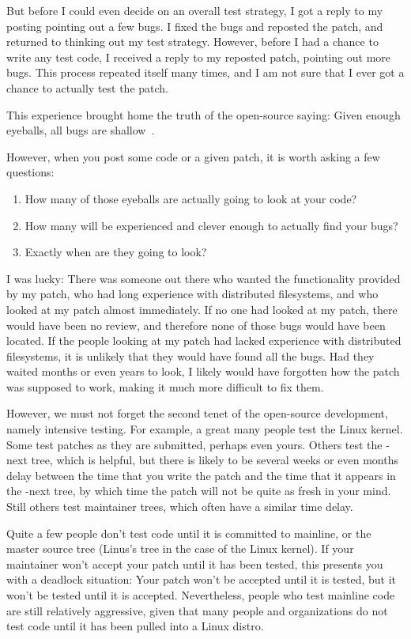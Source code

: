 But before I could even decide on an overall test strategy, I got a
reply to my posting pointing out a few bugs.
I fixed the bugs and reposted the patch, and returned to thinking
out my test strategy.
However, before I had a chance to write any test code, I received
a reply to my reposted patch, pointing out more bugs.
This process repeated itself many times, and I am not sure that I
ever got a chance to actually test the patch.

This experience brought home the truth of the open-source saying:
Given enough eyeballs, all bugs are shallow~\cite{EricSRaymond99b}.

However, when you post some code or a given patch, it is worth
asking a few questions:

\begin{enumerate}
\item	How many of those eyeballs are actually going to look at your code?
\item	How many will be experienced and clever enough to actually find
	your bugs?
\item	Exactly when are they going to look?
\end{enumerate}

I was lucky:
There was someone out there who wanted the functionality
provided by my patch, who had long experience with distributed filesystems,
and who looked at my patch almost immediately.
If no one had looked at my patch, there would have been no review, and
therefore none of those bugs would have been located.
If the people looking at my patch had lacked experience with distributed
filesystems, it is unlikely that they would have found all the bugs.
Had they waited months or even years to look, I likely would have forgotten
how the patch was supposed to work, making it much more difficult to
fix them.

However, we must not forget the second tenet of the open-source development,
namely intensive testing.
For example, a great many people test the Linux kernel.
Some test patches as they are submitted, perhaps even yours.
Others test the -next tree, which is helpful, but there is likely to be
several weeks or even months delay between the time that you write the
patch and the time that it appears in the -next tree, by which time the
patch will not be quite as fresh in your mind.
Still others test maintainer trees, which often have a similar time delay.

Quite a few people don't test code until it is committed to mainline,
or the master source tree (Linus's tree in the case of the Linux kernel).
If your maintainer won't accept your patch until it has been tested,
this presents you with a deadlock situation:
Your patch won't be accepted until it is tested, but it won't be tested
until it is accepted.
Nevertheless, people who test mainline code are still relatively
aggressive, given that many people and organizations do not test code
until it has been pulled into a Linux distro.

